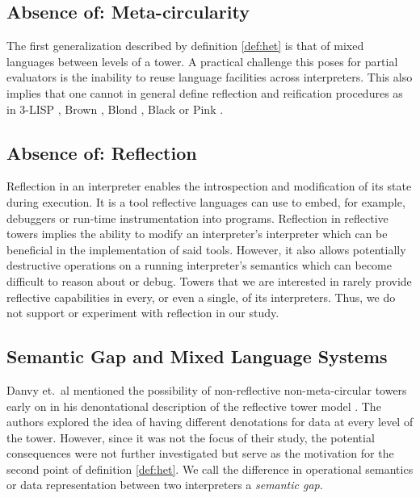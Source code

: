 \documentclass[a4paper,12pt,twoside,openright]{report}
\theoremstyle{definition}
\begin{document}
\subsection{Absence of: Meta-circularity}
The first generalization described by definition \ref{def:het} is that of mixed languages between levels of a tower. A practical challenge this poses for partial evaluators is the inability to reuse language facilities across interpreters. This also implies that one cannot in general define reflection and reification procedures as in 3-LISP \cite{smith1984reflection}, Brown \cite{wand1988mystery}, Blond \cite{danvy1988intensions}, Black \cite{asai1996duplication} or Pink \cite{amin2017collapsing}.

\subsection{Absence of: Reflection}
Reflection in an interpreter enables the introspection and modification of its state during execution. It is a tool reflective languages can use to embed, for example, debuggers or run-time instrumentation into programs. Reflection in reflective towers implies the ability to modify an interpreter's interpreter which can be beneficial in the implementation of said tools. However, it also allows potentially destructive operations on a running interpreter's semantics which can become difficult to reason about or debug. Towers that we are interested in rarely provide reflective capabilities in every, or even a single, of its interpreters. Thus, we do not support or experiment with reflection in our study.

\subsection{Semantic Gap and Mixed Language Systems}
Danvy et.~al mentioned the possibility of non-reflective non-meta-circular towers early on in his denontational description of the reflective tower model \cite{danvy1988intensions}. The authors explored the idea of having different denotations for data at every level of the tower. However, since it was not the focus of their study, the potential consequences were not further investigated but serve as the motivation for the second point of definition \ref{def:het}. We call the difference in operational semantics or data representation between two interpreters a \textit{semantic gap}.
\end{document}
